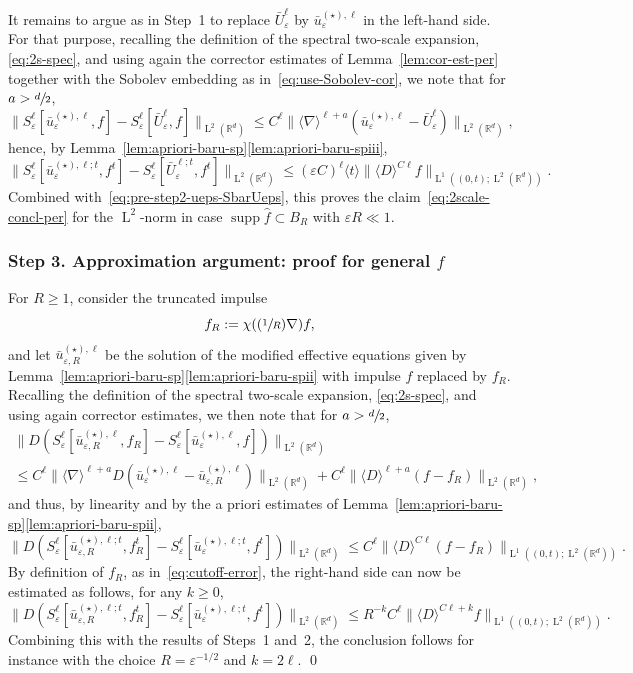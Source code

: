 \documentclass[JEP,XML,SOM,Unicode,published]{cedram}
\newcommand{\Psfrac}[2]{(\sfrac{#1}{#2})}
\theoremstyle{plain}
\theoremstyle{definition}
\numberwithin{equation}{section}
\newcommand{\e}{\varepsilon}
\newcommand{\R}{\mathbb R}
\newcommand{\Ld}{\operatorname{L}}
\newcommand{\supp}{\operatorname{supp}}
\newcommand{\step}[1]{\subsubsection*{Step \textup #1}}
\begin{document}
It remains to argue as in Step~1 to replace $\bar U_\e^\ell$ by $\bar u_\e^{(\star),\ell}$ in the left-hand side.
For that purpose, recalling the definition of the spectral two-scale expansion, \cf \eqref{eq:2s-spec}, and using again the corrector estimates of Lemma~\ref{lem:cor-est-per} together with the Sobolev embedding as in~\eqref{eq:use-Sobolev-cor}, we note that for $a>\sfrac d2$,
\begin{equation*}
\|S_\e^{\ell}[\bar u_\e^{(\star),\ell},f]-S_\e^{\ell}[\bar U_\e^{\ell},f]\|_{\Ld^2(\R^d)}
\le C^\ell\|\langle\nabla\rangle^{\ell+a} (\bar u_\e^{(\star),\ell}-\bar U_\e^{\ell})\|_{\Ld^2(\R^d)},
\end{equation*}
hence, by Lemma~\ref{lem:apriori-baru-sp}\eqref{lem:apriori-baru-spiii},
\begin{equation*}
\|S_\e^{\ell}[\bar u_\e^{(\star),\ell;t},f^t]-S_\e^{\ell}[\bar U_\e^{\ell;t},f^t]\|_{\Ld^2(\R^d)}
\le (\e C)^\ell\langle t\rangle\|\langle D\rangle^{C\ell}f\|_{\Ld^1((0,t);\Ld^2(\R^d))}.
\end{equation*}
Combined with~\eqref{eq:pre-step2-ueps-SbarUeps}, this proves the claim~\eqref{eq:2scale-concl-per} for the $\Ld^2$-norm in case $\supp\hat f\subset B_R$ with $\e R\ll1$.

\step{3. Approximation argument: proof for general $f$}
For $R\ge1$, consider the truncated impulse
\[f_R:=\chi(\Psfrac1R\nabla)f,\]
and let $\bar u_{\e,R}^{(\star),\ell}$ be the solution of the modified effective equations given by Lem\-ma~\ref{lem:apriori-baru-sp}\eqref{lem:apriori-baru-spii} with impulse $f$ replaced by $f_R$.
Recalling the definition of the spectral two-scale expansion, \cf \eqref{eq:2s-spec}, and using again corrector estimates, we then note that for $a>\sfrac d2$,
\begin{multline*}
\|D(S_\e^{\ell}[\bar u_{\e,R}^{(\star),\ell},f_R]-S_\e^{\ell}[\bar u_\e^{(\star),\ell},f])\|_{\Ld^2(\R^d)}\\
\le C^\ell\|\langle\nabla\rangle^{\ell+a} D(\bar u_\e^{(\star),\ell}-\bar u_{\e,R}^{(\star),\ell})\|_{\Ld^2(\R^d)}
+C^\ell\|\langle D\rangle^{\ell+a}(f-f_R)\|_{\Ld^2(\R^d)},
\end{multline*}
and thus, by linearity and by the a priori estimates of Lemma~\ref{lem:apriori-baru-sp}\eqref{lem:apriori-baru-spii},
\begin{equation*}
\|D(S_\e^{\ell}[\bar u_{\e,R}^{(\star),\ell;t},f_R^t]-S_\e^{\ell}[\bar u_\e^{(\star),\ell;t},f^t])\|_{\Ld^2(\R^d)}
\le C^\ell\|{\langle D\rangle^{C\ell}}(f-f_R)\|_{\Ld^1((0,t);\Ld^2(\R^d))}.
\end{equation*}
By definition of $f_R$, as in~\eqref{eq:cutoff-error}, the right-hand side can now be estimated as follows, for any $k\ge0$,
\begin{equation*}
\|D(S_\e^{\ell}[\bar u_{\e,R}^{(\star),\ell;t},f_R^t]-S_\e^{\ell}[\bar u_\e^{(\star),\ell;t},f^t])\|_{\Ld^2(\R^d)}
\le R^{-k}C^\ell\|\langle D\rangle^{C\ell+k}f\|_{\Ld^1((0,t);\Ld^2(\R^d))}.
\end{equation*}
Combining this with the results of Steps~1 and~2, the conclusion follows for instance with the choice $R=\e^{-1/2}$ and $k=2\ell$.
\qed
\end{document}

